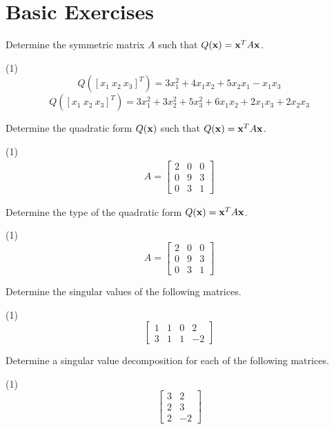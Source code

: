 \section{Basic Exercises}

Determine the symmetric matrix $A$ such that $Q(\mathbf x) = \mathbf x^T A \mathbf x$.
\begin{tasks}[style=enumerate](1)
\task
  \begin{displaymath}
    Q([x_1 \ x_2 \ x_3]^T)
    = 3x_1^2 + 4 x_1 x_2 + 5 x_2 x_1 - x_1 x_3
  \end{displaymath}
\task
  \begin{displaymath}
    Q([x_1 \ x_2 \ x_3]^T)
    = 3x_1^2 + 3x_2^2 + 5x_3^2 + 6x_1 x_2 + 2x_1 x_3 + 2x_2 x_3
  \end{displaymath}
\end{tasks}
Determine the quadratic form $Q(\mathbf x)$ such that $Q(\mathbf x) = \mathbf x^T A
\mathbf x$.
\begin{tasks}[resume, style=enumerate](1)
\task
  \begin{align*}
    A =
    \begin{bmatrix}
      2 & 0 & 0 \\
      0 & 9 & 3 \\
      0 & 3 & 1
    \end{bmatrix}
  \end{align*}
\end{tasks}
Determine the type of the quadratic form $Q(\mathbf x) = \mathbf x^T A \mathbf x$.
\begin{tasks}[resume, style=enumerate](1)
\task
  \begin{displaymath}
    A =
    \begin{bmatrix}
      2 & 0 & 0 \\
      0 & 9 & 3 \\
      0 & 3 & 1
    \end{bmatrix}
  \end{displaymath}
\end{tasks}
Determine the singular values of the following matrices.
\begin{tasks}[resume, style=enumerate](1)
\task
  \begin{displaymath}
    \begin{bmatrix}
      1 & 1 & 0 & 2 \\
      3 & 1 & 1 & -2
    \end{bmatrix}
  \end{displaymath}
\end{tasks}
Determine a singular value decomposition for each of the following
matrices.
\begin{tasks}[resume, style=enumerate](1)
\task
  \begin{displaymath}
    \begin{bmatrix}
      3 & 2 \\
      2 & 3 \\
      2 & -2
    \end{bmatrix}
  \end{displaymath}
\end{tasks}

